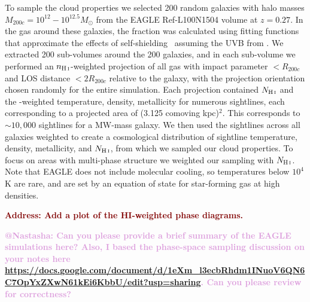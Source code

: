 \documentclass[fleqn,usenatbib]{mnras}
\makeatletter
\newcommand{\todo}[1]{\textcolor{Maroon}{\textbf{Address: #1}}}
\newcommand{\atnastasha}[1]{\textcolor{Plum}{\textbf{@Nastasha: #1}}}
\makeatother
\begin{document}
To sample the cloud properties we selected 200 random galaxies with halo masses $M_{200c} = 10^{12} - 10^{12.5} M_\odot$ from the EAGLE Ref-L100N1504 volume at $z=0.27$.
In the gas around these galaxies, the  fraction was calculated using fitting functions that approximate the effects of self-shielding~\citep{Rahmati2013} assuming the UVB from \cite{Haardt2012}.
We extracted 200 sub-volumes around the 200 galaxies, and in each sub-volume we performed an $n_{\ion{H}{I}}$-weighted projection of all gas with impact parameter $< R_{200c}$ and LOS distance $< 2 R_{200c}$ relative to the galaxy, with the projection orientation chosen randomly for the entire simulation.
Each projection contained $N_{\ion{H}{I}}$ and the -weighted temperature, density, metallicity for numerous sightlines, each corresponding to a projected area of (3.125 comoving kpc)$^2$.
This corresponds to $\sim 10,000$ sightlines for a MW-mass galaxy.
We then used the sightlines across all galaxies weighted to create a cosmological distribution of sightline temperature, density, metallicity, and $N_{\ion{H}{I}}$, from which we sampled our cloud properties.
To focus on areas with multi-phase structure we weighted our sampling with $N_{\ion{H}{I}}$.
Note that EAGLE does not include molecular cooling, so temperatures below $10^4$ K are rare, and are set by an equation of state for star-forming gas at high densities.

\todo{Add a plot of the HI-weighted phase diagrams.}

\atnastasha{
Can you please provide a brief summary of the EAGLE simulations here?
Also, I based the phase-space sampling discussion on your notes here \url{https://docs.google.com/document/d/1eXm_l3ecbRhdm1INuoV6QN6C7OpYxZXwN61kEi6KbbU/edit?usp=sharing}.
Can you please review for correctness?
}
\end{document}
